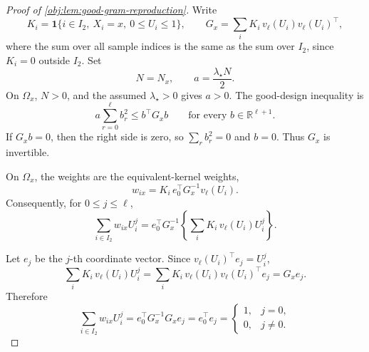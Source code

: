 \begin{proof}[Proof of \cref{obj:lem:good-gram-reproduction}]
Write
\[
K_i=\mathbf 1\{i\in I_2,\ X_i=x,\ 0\le U_i\le1\},
\qquad
G_x=\sum_{i}K_i\,v_\ell(U_i)v_\ell(U_i)^\top ,
\]
where the sum over all sample indices is the same as the sum over \(I_2\), since \(K_i=0\) outside \(I_2\).  Set
\[
N=N_x,\qquad
a=\frac{\lambda_\star N}{2}.
\]
On \(\Omega_x\), \(N>0\), and the assumed \(\lambda_\star>0\) gives \(a>0\).  The good-design inequality is
\[
a\sum_{r=0}^{\ell}b_r^2
\le
b^\top G_x b
\qquad\text{for every }b\in\mathbb R^{\ell+1}.
\]
If \(G_x b=0\), then the right side is zero, so \(\sum_rb_r^2=0\) and \(b=0\).  Thus \(G_x\) is invertible. %

On \(\Omega_x\), the weights are the equivalent-kernel weights,
\[
w_{ix}=K_i\,e_0^\top G_x^{-1}v_\ell(U_i).
\]
Consequently, for \(0\le j\le\ell\),
\[
\sum_{i\in I_2}w_{ix}U_i^j
=
e_0^\top G_x^{-1}
\left\{\sum_iK_i\,v_\ell(U_i)U_i^j\right\}.
\]

Let \(e_j\) be the \(j\)-th coordinate vector.  Since \(v_\ell(U_i)^\top e_j=U_i^j\),
\[
\sum_iK_i\,v_\ell(U_i)U_i^j
=
\sum_iK_i\,v_\ell(U_i)v_\ell(U_i)^\top e_j
=
G_xe_j .
\]
Therefore
\[
\sum_{i\in I_2}w_{ix}U_i^j
=
e_0^\top G_x^{-1}G_xe_j
=
e_0^\top e_j
=
\begin{cases}
1,&j=0,\\
0,&j\ne0.
\end{cases}
\]
\end{proof}
